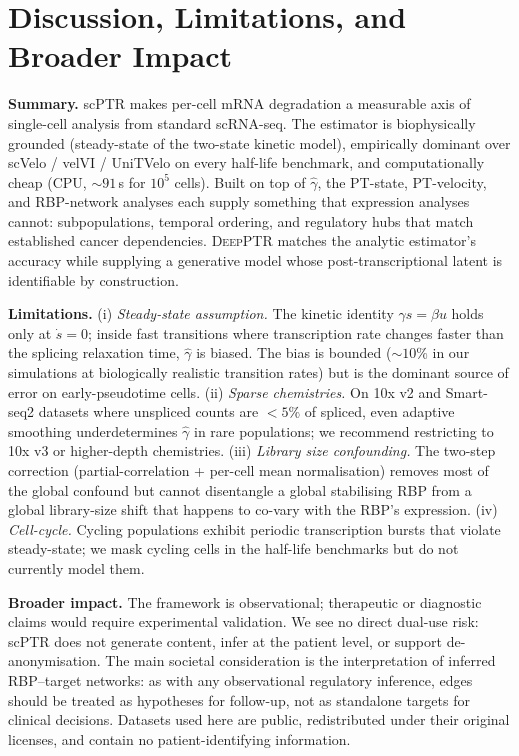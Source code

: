 \documentclass{article}
\begin{document}
\section{Discussion, Limitations, and Broader Impact}

\textbf{Summary.} scPTR makes per-cell mRNA degradation a measurable axis of single-cell analysis from standard scRNA-seq. The estimator is biophysically grounded (steady-state of the two-state kinetic model), empirically dominant over scVelo / velVI / UniTVelo on every half-life benchmark, and computationally cheap (CPU, ${\sim}91$\,s for $10^5$ cells). Built on top of $\widehat{\gamma}$, the PT-state, PT-velocity, and RBP-network analyses each supply something that expression analyses cannot: subpopulations, temporal ordering, and regulatory hubs that match established cancer dependencies. \textsc{DeepPTR} matches the analytic estimator's accuracy while supplying a generative model whose post-transcriptional latent is identifiable by construction.

\textbf{Limitations.} (i) \textit{Steady-state assumption.} The kinetic identity $\gamma s{=}\beta u$ holds only at $\dot{s}{=}0$; inside fast transitions where transcription rate changes faster than the splicing relaxation time, $\widehat{\gamma}$ is biased. The bias is bounded (${\sim}10\%$ in our simulations at biologically realistic transition rates) but is the dominant source of error on early-pseudotime cells. (ii) \textit{Sparse chemistries.} On 10x v2 and Smart-seq2 datasets where unspliced counts are $< 5\%$ of spliced, even adaptive smoothing underdetermines $\widehat{\gamma}$ in rare populations; we recommend restricting to 10x v3 or higher-depth chemistries. (iii) \textit{Library size confounding.} The two-step correction (partial-correlation + per-cell mean normalisation) removes most of the global confound but cannot disentangle a global stabilising RBP from a global library-size shift that happens to co-vary with the RBP's expression. (iv) \textit{Cell-cycle.} Cycling populations exhibit periodic transcription bursts that violate steady-state; we mask cycling cells in the half-life benchmarks but do not currently model them.

\textbf{Broader impact.} The framework is observational; therapeutic or diagnostic claims would require experimental validation. We see no direct dual-use risk: scPTR does not generate content, infer at the patient level, or support de-anonymisation. The main societal consideration is the interpretation of inferred RBP--target networks: as with any observational regulatory inference, edges should be treated as hypotheses for follow-up, not as standalone targets for clinical decisions. Datasets used here are public, redistributed under their original licenses, and contain no patient-identifying information.
\end{document}
